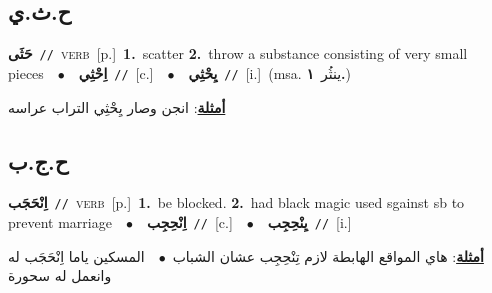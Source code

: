 \documentclass[10pt,a4paper,twoside]{article} %
\begin{document}
\begin{multicols}{2}
\vspace{-3mm}
\subsection*{\color{blue}\foreignlanguage{arabic}{ح.ث.ي}\color{blue}{}} 

{\setlength\topsep{0pt}\textbf{\foreignlanguage{arabic}{حَثَى}}\ {\color{gray}\texttt{//}\color{black}}\ \textsc{verb}\ [p.]\ \textbf{1.}~scatter  \textbf{2.}~throw a substance consisting of very small pieces\ \ $\bullet$\ \ \setlength\topsep{0pt}\textbf{\foreignlanguage{arabic}{اِحْثِي}}\ {\color{gray}\texttt{//}\color{black}}\ [c.]\ \ $\bullet$\ \ \setlength\topsep{0pt}\textbf{\foreignlanguage{arabic}{يِحْثِي}}\ {\color{gray}\texttt{//}\color{black}}\ [i.]\ \color{gray}(msa. \foreignlanguage{arabic}{ينثُر}~\foreignlanguage{arabic}{\textbf{١.}})\color{black}\  \begin{flushright}\color{gray}\foreignlanguage{arabic}{\textbf{\underline{\foreignlanguage{arabic}{أمثلة}}}: انجن وصار يِحْثِي التراب عراسه}\end{flushright}\color{black}} \vspace{2mm}

\vspace{-3mm}
\subsection*{\color{blue}\foreignlanguage{arabic}{ح.ج.ب}\color{blue}{}} 

{\setlength\topsep{0pt}\textbf{\foreignlanguage{arabic}{اِنْحَجَب}}\ {\color{gray}\texttt{//}\color{black}}\ \textsc{verb}\ [p.]\ \textbf{1.}~be blocked.  \textbf{2.}~had black magic used sgainst sb to prevent marriage\ \ $\bullet$\ \ \setlength\topsep{0pt}\textbf{\foreignlanguage{arabic}{اِنْحِجِب}}\ {\color{gray}\texttt{//}\color{black}}\ [c.]\ \ $\bullet$\ \ \setlength\topsep{0pt}\textbf{\foreignlanguage{arabic}{يِنْحِجِب}}\ {\color{gray}\texttt{//}\color{black}}\ [i.]\  \begin{flushright}\color{gray}\foreignlanguage{arabic}{\textbf{\underline{\foreignlanguage{arabic}{أمثلة}}}: هاي المواقع الهابطة لازم تِنْحِجِب عشان الشباب\ $\bullet$\ \  المسكين ياما اِنْحَجَب له وانعمل له سحورة}\end{flushright}\color{black}} \vspace{2mm}


\end{multicols}
\end{document}
